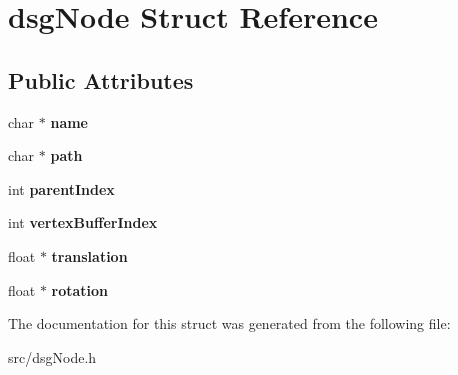 \hypertarget{structdsgNode}{}\section{dsg\+Node Struct Reference}
\label{structdsgNode}
\subsection*{Public Attributes}
\begin{DoxyCompactItemize}
\item 
\hypertarget{structdsgNode_a68389ca824471da63b99e8ebe29bb8da}{}char $\ast$ {\bfseries name}\label{structdsgNode_a68389ca824471da63b99e8ebe29bb8da}

\item 
\hypertarget{structdsgNode_ac9b6747cf61333fcfb33c89f2814a06d}{}char $\ast$ {\bfseries path}\label{structdsgNode_ac9b6747cf61333fcfb33c89f2814a06d}

\item 
\hypertarget{structdsgNode_a362406587d6265bad70d35b3c00dacce}{}int {\bfseries parent\+Index}\label{structdsgNode_a362406587d6265bad70d35b3c00dacce}

\item 
\hypertarget{structdsgNode_a9f59d282a645687d443b6b0930c68cd5}{}int {\bfseries vertex\+Buffer\+Index}\label{structdsgNode_a9f59d282a645687d443b6b0930c68cd5}

\item 
\hypertarget{structdsgNode_aac3fc6b3fcc88ee874186562d138b25a}{}float $\ast$ {\bfseries translation}\label{structdsgNode_aac3fc6b3fcc88ee874186562d138b25a}

\item 
\hypertarget{structdsgNode_a13cb744b13e6e1db2b847682a125b997}{}float $\ast$ {\bfseries rotation}\label{structdsgNode_a13cb744b13e6e1db2b847682a125b997}

\end{DoxyCompactItemize}


The documentation for this struct was generated from the following file\+:\begin{DoxyCompactItemize}
\item 
src/dsg\+Node.\+h\end{DoxyCompactItemize}
